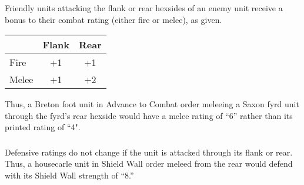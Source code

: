 \subsubsection[Flank or Rear]{} Friendly units attacking the flank or rear hexsides of an enemy unit receive a bonus to their combat rating (either fire or melee), as given.

\begin{tabular}{ lcc }
  & \textbf{Flank} & \textbf{Rear} \\
  \hline
  Fire & +1 & +1 \\
  Melee & +1 & +2 \\
\end{tabular}

Thus, a Breton foot unit in Advance to Combat order meleeing a Saxon fyrd unit through the fyrd's rear hexside would have a melee rating of “6” rather than its printed rating of “4".

\subsubsection[Defensive Ratings]{} Defensive ratings do not change if the unit is attacked through its flank or rear. Thus, a housecarle unit in Shield Wall order meleed from the rear would defend with its Shield Wall strength of “8.”
